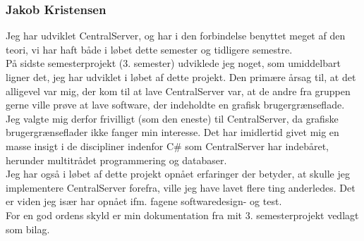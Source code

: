 \subsubsection{Jakob Kristensen}
Jeg har udviklet CentralServer, og har i den forbindelse benyttet meget af den teori, vi har haft både i løbet dette semester og tidligere semestre.\\

På sidste semesterprojekt (3. semester) udviklede jeg noget, som umiddelbart ligner det, jeg har udviklet i løbet af dette projekt. Den primære årsag til, at det alligevel var mig, der kom til at lave CentralServer var, at de andre fra gruppen gerne ville prøve at lave software, der indeholdte en grafisk brugergrænseflade. Jeg valgte mig derfor frivilligt (som den eneste) til CentralServer, da grafiske brugergrænseflader ikke fanger min interesse. Det har imidlertid givet mig en masse insigt i de discipliner indenfor C\# som CentralServer har indebåret, herunder multitrådet programmering og databaser.\\

Jeg har også i løbet af dette projekt opnået erfaringer der betyder, at skulle jeg implementere CentralServer forefra, ville jeg have lavet flere ting anderledes. Det er viden jeg især har opnået ifm. fagene softwaredesign- og test.\\

For en god ordens skyld er min dokumentation fra mit 3. semesterprojekt vedlagt som bilag.